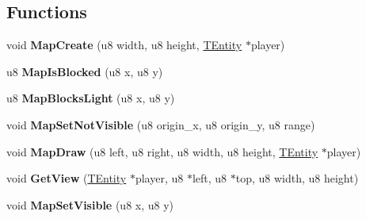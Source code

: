 \subsection*{Functions}
\begin{DoxyCompactItemize}
\item 
\mbox{\label{group__Game_ga0a25d4a00a01f6a01f415c8cf22b17d2}} 
void {\bfseries Map\+Create} (u8 width, u8 height, \mbox{\hyperlink{structTEntity}{T\+Entity}} $\ast$player)
\item 
\mbox{\label{group__Game_ga3eae0d3c0cf7368023838ed2dfc5e3c8}} 
u8 {\bfseries Map\+Is\+Blocked} (u8 x, u8 y)
\item 
\mbox{\label{group__Game_ga4a96cfd7d7f5dab759c0274d498ca927}} 
u8 {\bfseries Map\+Blocks\+Light} (u8 x, u8 y)
\item 
\mbox{\label{group__Game_ga806e9ea5321e82e566b161fcbd5e2e2d}} 
void {\bfseries Map\+Set\+Not\+Visible} (u8 origin\+\_\+x, u8 origin\+\_\+y, u8 range)
\item 
\mbox{\label{group__Game_ga300f688f7b1989dba73d6bae2772a7dc}} 
void {\bfseries Map\+Draw} (u8 left, u8 right, u8 width, u8 height, \mbox{\hyperlink{structTEntity}{T\+Entity}} $\ast$player)
\item 
\mbox{\label{group__Game_gae17467d65d599928e1b7bfa3ddeee49f}} 
void {\bfseries Get\+View} (\mbox{\hyperlink{structTEntity}{T\+Entity}} $\ast$player, u8 $\ast$left, u8 $\ast$top, u8 width, u8 height)
\item 
\mbox{\label{group__Game_gaaf6d5d23473322d54274ad7aa393adcd}} 
void {\bfseries Map\+Set\+Visible} (u8 x, u8 y)
\end{DoxyCompactItemize}
